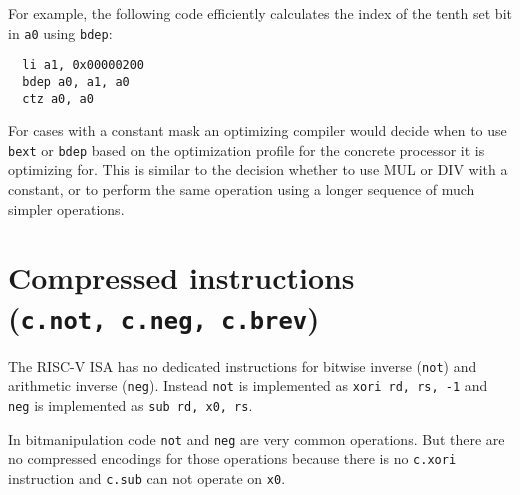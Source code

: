 For example, the following code efficiently calculates the index of the tenth
set bit in {\tt a0} using \texttt{bdep}:

\begin{verbatim}
  li a1, 0x00000200
  bdep a0, a1, a0
  ctz a0, a0
\end{verbatim}

For cases with a constant mask an optimizing compiler would decide when to use
\texttt{bext} or \texttt{bdep} based on the optimization profile for the
concrete processor it is optimizing for. This is similar to the decision
whether to use MUL or DIV with a constant, or to perform the same operation
using a longer sequence of much simpler operations.



%
%
%
%
%
%
%
%


\section{Compressed instructions (\texttt{c.not,\ c.neg,\ c.brev})}

The RISC-V ISA has no dedicated instructions for bitwise inverse (\texttt{not})
and arithmetic inverse (\texttt{neg}). Instead \texttt{not} is implemented as
\texttt{xori\ rd,\ rs,\ -1} and \texttt{neg} is implemented as
\texttt{sub\ rd,\ x0,\ rs}.

In bitmanipulation code \texttt{not} and \texttt{neg} are very common operations. But
there are no compressed encodings for those operations because there is no \texttt{c.xori}
instruction and \texttt{c.sub} can not operate on \texttt{x0}.

